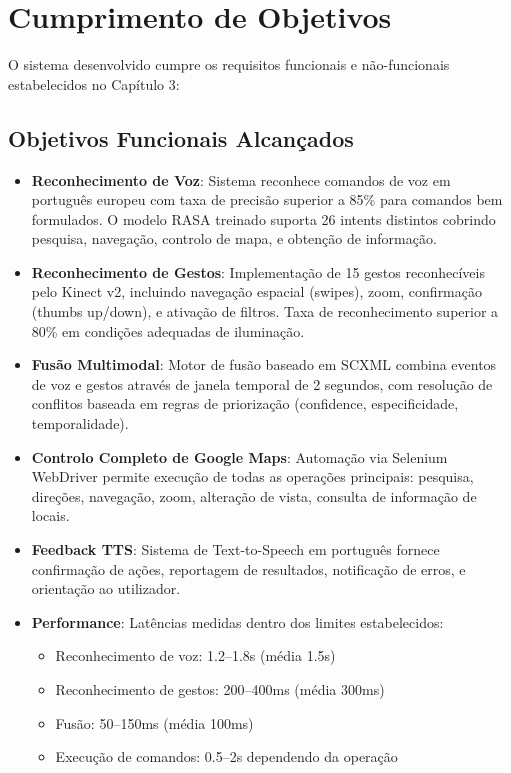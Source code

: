 \documentclass{report}
\begin{document}
\section{Cumprimento de Objetivos}

O sistema desenvolvido cumpre os requisitos funcionais e não-funcionais estabelecidos no Capítulo 3:

\subsection{Objetivos Funcionais Alcançados}

\begin{itemize}
    \item \textbf{Reconhecimento de Voz}: Sistema reconhece comandos de voz em português europeu com taxa de precisão superior a 85\% para comandos bem formulados. O modelo RASA treinado suporta 26 intents distintos cobrindo pesquisa, navegação, controlo de mapa, e obtenção de informação.

    \item \textbf{Reconhecimento de Gestos}: Implementação de 15 gestos reconhecíveis pelo Kinect v2, incluindo navegação espacial (swipes), zoom, confirmação (thumbs up/down), e ativação de filtros. Taxa de reconhecimento superior a 80\% em condições adequadas de iluminação.

    \item \textbf{Fusão Multimodal}: Motor de fusão baseado em SCXML combina eventos de voz e gestos através de janela temporal de 2 segundos, com resolução de conflitos baseada em regras de priorização (confidence, especificidade, temporalidade).

    \item \textbf{Controlo Completo de Google Maps}: Automação via Selenium WebDriver permite execução de todas as operações principais: pesquisa, direções, navegação, zoom, alteração de vista, consulta de informação de locais.

    \item \textbf{Feedback TTS}: Sistema de Text-to-Speech em português fornece confirmação de ações, reportagem de resultados, notificação de erros, e orientação ao utilizador.

    \item \textbf{Performance}: Latências medidas dentro dos limites estabelecidos:
    \begin{itemize}
        \item Reconhecimento de voz: 1.2--1.8s (média 1.5s)
        \item Reconhecimento de gestos: 200--400ms (média 300ms)
        \item Fusão: 50--150ms (média 100ms)
        \item Execução de comandos: 0.5--2s dependendo da operação
    \end{itemize}
\end{itemize}
\end{document}
